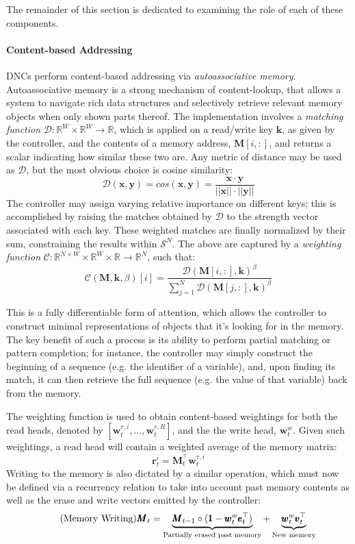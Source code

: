 \documentclass[]{article}
\begin{document}
The remainder of this section is dedicated to examining the role of each of these components.

\paragraph{Content-based Addressing} 
DNCs perform content-based addressing via \textit{autoassociative memory}\cite[Chapter~12]{rojas}. Autoassociative memory is a strong mechanism of content-lookup, that allows a system to navigate rich data structures and selectively retrieve relevant memory objects when only shown parts thereof. The implementation involves a \textit{matching function} $\mathcal{D}: \mathbb{R}^W \times \mathbb{R}^W \to \mathbb{R}$, which is applied on a read/write key $\pmb{k}$, as given by the controller, and the contents of a memory address, $\pmb{M}[i,:]$, and returns a scalar indicating how similar these two are. Any metric of distance may be used as $\mathcal{D}$, but the most obvious choice is cosine similarity:
 \[
 \tag{Cosine Similarity} \label{eqn:Cosine}
\mathcal{D}(\pmb{x}, \pmb{y}) = cos(\pmb{x},\pmb{y}) = \frac{\pmb{x} \cdot \pmb{y}}{||\pmb{x}|| \cdot ||\pmb{y}||}
\]
The controller may assign varying relative importance on different keys; this is accomplished by raising the matches obtained by $\mathcal{D}$ to the strength vector associated with each key. These weighted matches are finally normalized by their sum, constraining the results within $\mathcal{S}^N$. The above are captured by a \textit{weighting function} $\mathcal{C}: \mathbb{R}^{N \times W} \times \mathbb{R}^W \times \mathbb{R} \to \mathbb{R}^N$, such that:
\[
\tag{Weighting Function}
\mathcal{C}(\pmb{M},\pmb{k}, \beta)[i] = 
\frac{ \mathcal{D}(\pmb{M}[i,:],\pmb{k})^{\beta} }
{\sum\nolimits_{j=1}^N \mathcal{D}(\pmb{M}[j,:],\pmb{k})^{\beta}}
\]

This is a fully differentiable form of attention, which allows the controller to construct minimal representations of objects that it's looking for in the memory. The key benefit of such a process is its ability to perform partial matching or pattern completion; for instance, the controller may simply construct the beginning of a sequence (e.g. the identifier of a variable), and, upon finding its match, it can then retrieve the full sequence (e.g. the  value of that variable) back from the memory.

The weighting function is used to obtain content-based weightings for both the read heads, denoted by $[\pmb{w}_t^{r,i},\dots,\pmb{w}_t^{r,R}]$, and the the write head, $\pmb{w}_t^w$. Given such weightings, a read head will contain a weighted average of the memory matrix:
\[
\tag{Memory Reading}
\pmb{r}_t^i = \pmb{M}_t^{\top} \pmb{w}_t^{r,i} 
\]
Writing to the memory is also dictated by a similar operation, which must now be defined via a recurrency relation to take into account past memory contents as well as the erase and write vectors emitted by the controller:
\[
\tag{Memory Writing}
\pmb{M}_t = \underbrace{\pmb{M}_{t-1} \circ (\pmb{1} - \pmb{w}_t^w \pmb{e}_t^\top)}_{\text{\scriptsize Partially erased past memory}} + \underbrace{\pmb{w}_t^w \pmb{v}_t^\top}_{\text{\scriptsize New memory}}
\]
\end{document}
